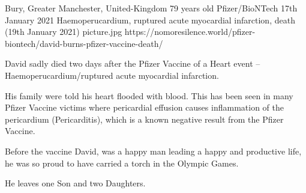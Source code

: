 {Bury, Greater Manchester, United-Kingdom}
{79 years old}
{Pfizer/BioNTech}
{17th January 2021}
{Haemoperucardium, ruptured acute myocardial infarction, death (19th January 2021)}
{picture.jpg}
{https://nomoresilence.world/pfizer-biontech/david-burns-pfizer-vaccine-death/}
{

David sadly died two days after the Pfizer Vaccine of a Heart event –
Haemoperucardium/ruptured acute myocardial infarction.

His family were told his heart flooded with blood. This has been seen in many
Pfizer Vaccine victims where pericardial effusion causes inflammation of the
pericardium (Pericarditis), which is a known negative result from the Pfizer
Vaccine.

Before the vaccine David, was a happy man leading a happy and productive life,
he was so proud to have carried a torch in the Olympic Games.

He leaves one Son and two Daughters.

}
